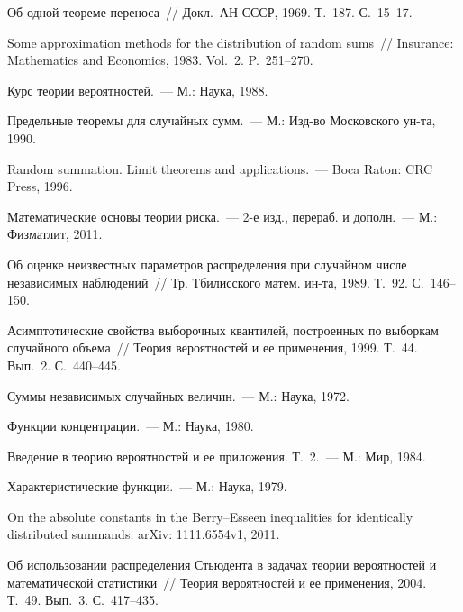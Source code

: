 \begin{multicols}{2}
{\small\frenchspacing
{%
\begin{thebibliography}{99}



 Об одной теореме переноса~// Докл.\ АН
СССР, 1969. Т.~187. С.~15--17.

 Some approximation methods for the
distribution of random sums~// Insurance: Mathematics and Economics,
1983. Vol.~2. P.~251--270.

 Курс теории вероятностей.~--- М.: Наука, 1988.

 Предельные теоремы для случайных
сумм.~--- М.: Изд-во Московского ун-та, 1990.

 Random summation. Limit
theorems and applications.~--- Boca Raton: CRC Press, 1996.

 Математические
основы теории риска.~--- 2-е изд., перераб. и дополн.~--- М.: Физматлит,
2011.

 Об оценке неизвестных параметров распределения
при случайном числе независимых наблюдений~// Тр. Тбилисского
матем. ин-та, 1989. Т.~92. С.~146--150.

 Асимптотические свойства выборочных квантилей,
построенных по выборкам случайного объема~// Теория вероятностей и
ее применения, 1999. Т.~44. Вып.~2. С.~440--445.

 Суммы независимых случайных величин.~--- М.:
Наука, 1972.

 Функции концентрации.~--- М.:
Наука, 1980.

 Введение в теорию вероятностей и ее приложения.
Т.~2.~--- М.: Мир, 1984.

 Характеристические функции.~--- М.: Наука, 1979.

 On the absolute constants in the
Berry--Esseen inequalities for identically distributed summands.
arXiv: 1111.6554v1, 2011.

 Об использовании распределения
Стьюдента в задачах теории вероятностей и математической статистики~// 
Теория вероятностей и ее применения, 2004. Т.~49. Вып.~3. С.~417--435.


\end{thebibliography}}}
\end{multicols}
